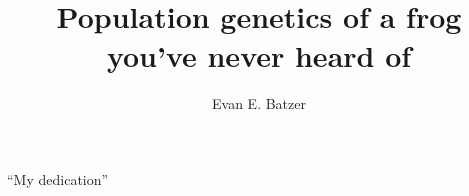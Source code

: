 \documentclass[twoside,12pt,final]{ucthesis-CA2012}
\begin{document}
\begin{ucfrontmatter}


  \title{Population genetics of a frog you've never heard of}
  \author{Evan E. Batzer}

   
  \othermemberC{} %
  
	\maketitle
	

    \begin{dedication}

      \vspace*{20ex}
      \begin{center}
      \begin{large}

        ``My dedication''


\end{large}
\end{center}
\end{dedication}
\end{ucfrontmatter}
\end{document}
